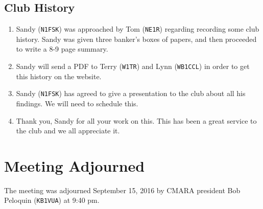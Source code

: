 \documentclass[10pt,letterpaper]{article}
\begin{document}
\subsection{Club History}
\begin{enumerate}
  \item Sandy (\texttt{N1FSK}) was approached by Tom (\texttt{NE1R}) regarding recording some club history. Sandy was given three banker's boxes of papers, and then proceeded to write a 8-9 page summary.
  \item Sandy will send a PDF to Terry (\texttt{W1TR}) and Lynn (\texttt{WB1CCL}) in order to get this history on the website.
  \item Sandy (\texttt{N1FSK}) has agreed to give a presentation to the club about all his findings. We will need to schedule this.
  \item Thank you, Sandy for all your work on this. This has been a great service to the club and we all appreciate it.
\end{enumerate}

\section{Meeting Adjourned}
The meeting was adjourned September 15, 2016 by CMARA president Bob Peloquin (\texttt{KB1VUA}) at 9:40 pm.
\end{document}

